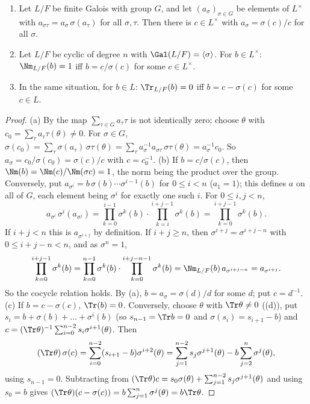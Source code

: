 \begin{theorem}\label{thm:galois:hilbert90}
\begin{enumerate}[label=(\alph*)]
\item Let $L/F$ be finite Galois with group $G$, and let $(a_\sigma)_{\sigma\in G}$ be elements of $L^\times$ with $a_{\sigma\tau}=a_\sigma\,\sigma(a_\tau)$ for all
$\sigma,\tau$. Then there is $c\in L^\times$ with $a_\sigma=\sigma(c)/c$ for all $\sigma$.
\item Let $L/F$ be cyclic of degree $n$ with $\Gal(L/F)=\langle\sigma\rangle$. For $b\in L^\times$: $\Nm_{L/F}(b)=1$ iff $b=c/\sigma(c)$ for some $c\in L^\times$.
\item In the same situation, for $b\in L$: $\Tr_{L/F}(b)=0$ iff $b=c-\sigma(c)$ for some $c\in L$.
\end{enumerate}
\end{theorem}

\begin{proof}
(a) By  the map $\sum_{\tau\in G}a_\tau\tau$ is not identically zero; choose $\theta$ with $c_0=\sum_\tau a_\tau\tau(\theta)\ne0$. For
$\sigma\in G$, $\sigma(c_0)=\sum_\tau\sigma(a_\tau)\,\sigma\tau(\theta)=\sum_\tau a_\sigma^{-1}a_{\sigma\tau}\,\sigma\tau(\theta)=a_\sigma^{-1}c_0$. So $a_\sigma=c_0/\sigma(c_0)=
\sigma(c)/c$ with $c=c_0^{-1}$.
(b) If $b=c/\sigma(c)$, then $\Nm(b)=\Nm(c)/\Nm(\sigma c)=1$, the norm being the product over the group. Conversely, put $a_{\sigma^i}=b\,\sigma(b)\cdots\sigma^{i-1}(b)$
for $0\le i<n$ ($a_1=1$); this defines $a$ on all of $G$, each element being $\sigma^i$ for exactly one such $i$. For $0\le i,j<n$,
\[
a_{\sigma^i}\,\sigma^i(a_{\sigma^j})=\prod_{k=0}^{i-1}\sigma^k(b)\cdot\prod_{k=i}^{i+j-1}\sigma^k(b)=\prod_{k=0}^{i+j-1}\sigma^k(b).
\]
If $i+j<n$ this is $a_{\sigma^{i+j}}$ by definition. If $i+j\ge n$, then $\sigma^{i+j}=\sigma^{i+j-n}$ with $0\le i+j-n<n$, and as $\sigma^n=1$,
\[
\prod_{k=0}^{i+j-1}\sigma^k(b)=\prod_{k=0}^{n-1}\sigma^k(b)\cdot\prod_{k=0}^{i+j-n-1}\sigma^k(b)=\Nm_{L/F}(b)\,a_{\sigma^{i+j-n}}=a_{\sigma^{i+j}}.
\]
So the cocycle relation holds. By (a), $b=a_\sigma=\sigma(d)/d$ for some $d$; put
$c=d^{-1}$.
(c) If $b=c-\sigma(c)$, $\Tr(b)=0$. Conversely, choose $\theta$ with $\Tr\theta\ne0$ ((d)), put $s_i=b+\sigma(b)+\dots+\sigma^i(b)$
(so $s_{n-1}=\Tr b=0$ and $\sigma(s_i)=s_{i+1}-b$) and $c=(\Tr\theta)^{-1}\sum_{i=0}^{n-2}s_i\sigma^{i+1}(\theta)$. Then
\[
(\Tr\theta)\,\sigma(c)=\sum_{i=0}^{n-2}(s_{i+1}-b)\sigma^{i+2}(\theta)=\sum_{j=1}^{n-2}s_j\sigma^{j+1}(\theta)-b\sum_{j=2}^{n}\sigma^{j}(\theta),
\]
using $s_{n-1}=0$. Subtracting from $(\Tr\theta)c=s_0\sigma(\theta)+\sum_{j=1}^{n-2}s_j\sigma^{j+1}(\theta)$ and using $s_0=b$ gives $(\Tr\theta)(c-\sigma(c))=b\sum_{j=1}^n
\sigma^j(\theta)=b\Tr\theta$.
\end{proof}

